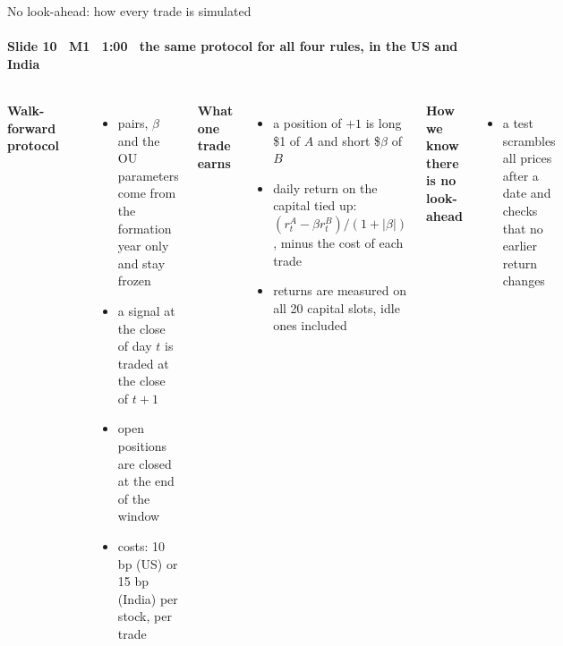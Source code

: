 \begin{frame}{No look-ahead: how every trade is simulated}
\framesubtitle{Slide 10 \textbullet\ M1 \textbullet\ 1:00 \textbullet\ the same protocol for all four rules, in the US and India}
\vspace{-2pt}
\begin{columns}[T,onlytextwidth]
  \footnotesize\raggedright
  \textbf{\color{deckAccent}Walk-forward protocol}\\[3pt]
  \centering
  \\[4pt]
  \raggedright
  \begin{itemize}\setlength{\itemsep}{1pt}
    \item pairs, $\beta$ and the OU parameters come from the formation year only and stay frozen
    \item a signal at the close of day $t$ is traded at the close of $t+1$
    \item open positions are closed at the end of the window
    \item costs: 10 bp (US) or 15 bp (India) per stock, per trade
  \end{itemize}
  \footnotesize\raggedright
  \textbf{\color{deckAccent}What one trade earns}
  \begin{itemize}\setlength{\itemsep}{1pt}
    \item a position of $+1$ is long \$1 of $A$ and short \$$\beta$ of $B$
    \item daily return on the capital tied up: $(r^A_t-\beta r^B_t)/(1+|\beta|)$, minus the cost of each trade
    \item returns are measured on all 20 capital slots, idle ones included
  \end{itemize}
  \vspace{2pt}
  \textbf{\color{deckAccent}How we know there is no look-ahead}
  \begin{itemize}\setlength{\itemsep}{1pt}
    \item a test scrambles all prices after a date and checks that no earlier return changes
  \end{itemize}
\end{columns}
\end{frame}
